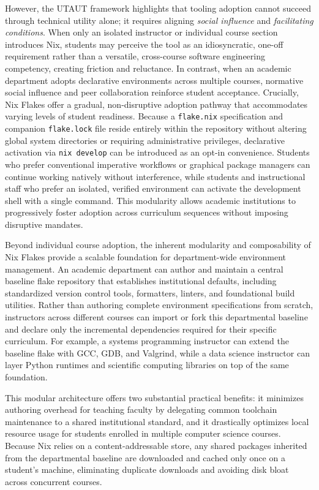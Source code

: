 However, the UTAUT framework highlights that tooling adoption cannot succeed through
technical utility alone; it requires aligning \emph{social influence} and \emph{facilitating
conditions}. When only an isolated instructor or individual course section introduces
Nix, students may perceive the tool as an idiosyncratic, one-off requirement rather
than a versatile, cross-course software engineering competency, creating friction
and reluctance. In contrast, when an academic department adopts declarative environments
across multiple courses, normative social influence and peer collaboration
reinforce student acceptance. Crucially, Nix Flakes offer a gradual, non-disruptive
adoption pathway that accommodates varying levels of student readiness. Because
a \texttt{flake.nix} specification and companion \texttt{flake.lock} file reside
entirely within the repository without altering global system directories or
requiring administrative privileges, declarative activation via \texttt{nix
develop} can be introduced as an opt-in convenience. Students who prefer conventional
imperative workflows or graphical package managers can continue working natively without
interference, while students and instructional staff who prefer an isolated, verified
environment can activate the development shell with a single command. This
modularity allows academic institutions to progressively foster adoption across
curriculum sequences without imposing disruptive mandates.

Beyond individual course adoption, the inherent modularity and composability of Nix
Flakes provide a scalable foundation for department-wide environment management.
An academic department can author and maintain a central baseline flake
repository that establishes institutional defaults, including standardized version
control tools, formatters, linters, and foundational build utilities. Rather than
authoring complete environment specifications from scratch, instructors across
different courses can import or fork this departmental baseline and declare only
the incremental dependencies required for their specific curriculum. For example,
a systems programming instructor can extend the baseline flake with GCC, GDB,
and Valgrind, while a data science instructor can layer Python runtimes and scientific
computing libraries on top of the same foundation.

This modular architecture offers two substantial practical benefits: it
minimizes authoring overhead for teaching faculty by delegating common toolchain
maintenance to a shared institutional standard, and it drastically optimizes local
resource usage for students enrolled in multiple computer science courses.
Because Nix relies on a content-addressable store, any shared packages inherited from
the departmental baseline are downloaded and cached only once on a student's machine,
eliminating duplicate downloads and avoiding disk bloat across concurrent
courses.

